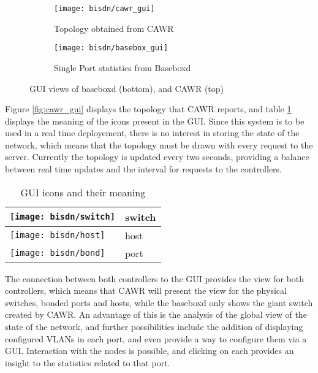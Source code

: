 \begin{figure} [H]
    \begin{subfigure}
        \centering
        \texttt{[image: bisdn/cawr\_gui]}
        \caption{Topology obtained from CAWR}
    \end{subfigure}
    \begin{subfigure}
        \centering
        \texttt{[image: bisdn/basebox\_gui]}
        \caption{Single Port statistics from Baseboxd}
    \end{subfigure}
    \caption{GUI views of baseboxd (bottom), and CAWR (top)}
\end{figure}

\par Figure \ref{fig:cawr_gui} displays the topology that CAWR reports, and table \ref{tab:gui-mapping} displays the meaning of the icons present in the GUI. Since 
this system is to be used in a real time deployement, there is no interest in storing the state of the network, which means that the topology must be drawn with 
every request to the server. Currently the topology is updated every two seconds, providing a balance between real time updates and the interval for requests to the
controllers.

\begin{table}[H]
    \centering
    \caption{GUI icons and their meaning}
    \label{tab:gui-mapping}
    \begin{tabular}{l | l}

        \centering
            \texttt{[image: bisdn/switch]}
        
        & switch     & \\ \hline 

            \texttt{[image: bisdn/host]}
        
        & host     & \\ \hline 
        
        \texttt{[image: bisdn/bond]}
        
        & port     & \\
   \end{tabular}
\end{table}

\par The connection between both controllers to the GUI provides the view for both controllers, which means that CAWR will present the view for the physical
switches, bonded ports and hosts, while the baseboxd only shows the giant switch created by CAWR. An advantage of this is the analysis of the global view of the
state of the network, and further possibilities include the addition of displaying configured VLANs in each port, and even provide a way to configure them via a GUI.
Interaction with the nodes is possible, and clicking on each provides an insight to the statistics related to that port.  
